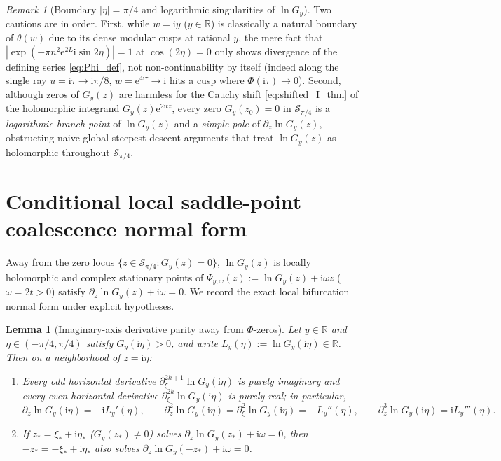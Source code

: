\documentclass[11pt,a4paper,reqno]{amsart}
\newtheorem{lemma}[theorem]{Lemma}
\theoremstyle{definition}
\theoremstyle{remark}
\newtheorem{remark}[theorem]{Remark}
\numberwithin{equation}{section}
\newcommand{\ii}{\mathrm{i}}
\newcommand{\ee}{\mathrm{e}}
\begin{document}
\begin{remark}[Boundary $|\eta|=\pi/4$ and logarithmic singularities of $\ln G_y$]\label{rem:log_sing}
Two cautions are in order. First, while $w = \ii y$ ($y \in \mathbb{R}$) is classically a natural boundary of $\theta(w)$ due to its dense modular cusps at rational $y$, the mere fact that $|\exp(-\pi n^2\ee^{2L}\ii\sin 2\eta)| = 1$ at $\cos(2\eta)=0$ only shows divergence of the defining series \eqref{eq:Phi_def}, not non-continuability by itself (indeed along the single ray $u = \ii\tau \to \ii\pi/8$, $w = \ee^{4\ii\tau} \to \ii$ hits a cusp where $\Phi(\ii\tau) \to 0$). Second, although zeros of $G_y(z)$ are harmless for the Cauchy shift \eqref{eq:shifted_I_thm} of the holomorphic integrand $G_y(z)\ee^{2\ii t z}$, every zero $G_y(z_0) = 0$ in $\mathcal{S}_{\pi/4}$ is a \emph{logarithmic branch point} of $\ln G_y(z)$ and a \emph{simple pole} of $\partial_z\ln G_y(z)$, obstructing naive global steepest-descent arguments that treat $\ln G_y(z)$ as holomorphic throughout $\mathcal{S}_{\pi/4}$.
\end{remark}

\section{Conditional local saddle-point coalescence normal form}\label{sec:coalescence}

Away from the zero locus $\{z \in \mathcal{S}_{\pi/4} : G_y(z) = 0\}$, $\ln G_y(z)$ is locally holomorphic and complex stationary points of $\Psi_{y,\omega}(z) := \ln G_y(z) + \ii\omega z$ ($\omega = 2t > 0$) satisfy $\partial_z\ln G_y(z) + \ii\omega = 0$. We record the exact local bifurcation normal form under explicit hypotheses.

\begin{lemma}[Imaginary-axis derivative parity away from $\Phi$-zeros]\label{lem:axis_symmetry}
Let $y \in \mathbb{R}$ and $\eta \in (-\pi/4,\pi/4)$ satisfy $G_y(\ii\eta) > 0$, and write $L_y(\eta) := \ln G_y(\ii\eta) \in \mathbb{R}$. Then on a neighborhood of $z = \ii\eta$:
\begin{enumerate}
\item[\textup{(a)}] Every odd horizontal derivative $\partial_\xi^{2k+1}\ln G_y(\ii\eta)$ is purely imaginary and every even horizontal derivative $\partial_\xi^{2k}\ln G_y(\ii\eta)$ is purely real; in particular,
\begin{equation}\label{eq:axis_derivs}
\partial_z\ln G_y(\ii\eta) = -\ii L_y'(\eta), \qquad \partial_z^2\ln G_y(\ii\eta) = \partial_\xi^2\ln G_y(\ii\eta) = -L_y''(\eta), \qquad \partial_z^3\ln G_y(\ii\eta) = \ii L_y'''(\eta).
\end{equation}
\item[\textup{(b)}] If $z_* = \xi_* + \ii\eta_*$ ($G_y(z_*) \neq 0$) solves $\partial_z\ln G_y(z_*) + \ii\omega = 0$, then $-\bar{z}_* = -\xi_* + \ii\eta_*$ also solves $\partial_z\ln G_y(-\bar{z}_*) + \ii\omega = 0$.
\end{enumerate}
\end{lemma}
\end{document}

